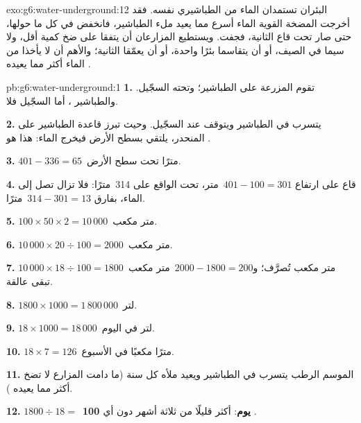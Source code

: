 \begin{solution}{exo:g6:water-underground:12}
البئران تستمدان الماء من  الطباشيري نفسه. فقد أخرجت المضخة القوية الماء
أسرع مما يعيد  ملء الطباشير، فانخفض  في كل
ما حولها، حتى صار تحت قاع  الثانية، فجفت. ويستطيع المزارعان
أن يتفقا على ضخ كمية أقل، ولا سيما في الصيف، أو أن يتقاسما بئرًا واحدة، أو أن يعمّقا
 الثانية؛ والأهم أن لا يأخذا من الماء أكثر مما يعيده
.
\end{solution}

\begin{solution}{pb:g6:water-underground:1}
\textbf{1.} تقوم المزرعة على الطباشير؛ وتحته السجّيل. والطباشير
، أما السجّيل فلا.

\textbf{2.} يتسرب  في الطباشير ويتوقف عند السجّيل. وحيث تبرز
قاعدة الطباشير على المنحدر، يلتقي  بسطح الأرض
فيخرج الماء: هذا هو .

\textbf{3.} $401 - 336 = 65$~مترًا تحت سطح الأرض.

\textbf{4.} قاع  على ارتفاع $401 - 100 = 301$~متر، تحت
 الواقع على  314~مترًا: فلا تزال  تصل إلى الماء، بفارق $314 - 301 =
13$~مترًا.

\textbf{5.} $100 \times 50 \times 2 = 10\,000$~متر مكعب.

\textbf{6.} $10\,000 \times 20 \div 100 = 2000$~متر مكعب.

\textbf{7.} $10\,000 \times 18 \div 100 = 1800$~متر مكعب تُصرَّف؛
و$2000 - 1800 = 200$~متر مكعب تبقى عالقة.

\textbf{8.} $1800 \times 1000 = 1\,800\,000$~لتر.

\textbf{9.} $18 \times 1000 = 18\,000$~لتر في اليوم.

\textbf{10.} $18 \times 7 = 126$~مترًا مكعبًا في الأسبوع.

\textbf{11.}  الموسم الرطب يتسرب في الطباشير ويعيد ملأه
كل سنة (ما دامت المزارع لا تضخ أكثر مما يعيده ).

\textbf{12.} $1800 \div 18 = $~\textbf{100 يوم}: أكثر قليلًا من ثلاثة
أشهر دون أي .
\end{solution}

